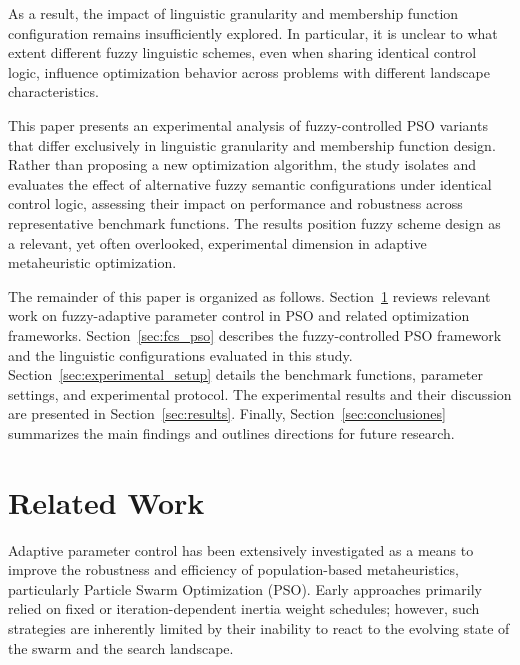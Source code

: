 \documentclass[runningheads]{llncs}
\begin{document}
As a result, the impact of linguistic granularity and membership function configuration remains insufficiently explored. In particular, it is unclear to what extent different fuzzy linguistic schemes, even when sharing identical control logic, influence optimization behavior across problems with different landscape characteristics.

This paper presents an experimental analysis of fuzzy-controlled PSO variants that differ exclusively in linguistic granularity and membership function design. Rather than proposing a new optimization algorithm, the study isolates and evaluates the effect of alternative fuzzy semantic configurations under identical control logic, assessing their impact on performance and robustness across representative benchmark functions. The results position fuzzy scheme design as a relevant, yet often overlooked, experimental dimension in adaptive metaheuristic optimization.

The remainder of this paper is organized as follows. Section~\ref{sec:related_work} reviews relevant work on fuzzy-adaptive parameter control in PSO and related optimization frameworks. Section~\ref{sec:fcs_pso} describes the fuzzy-controlled PSO framework and the linguistic configurations evaluated in this study. Section~\ref{sec:experimental_setup} details the benchmark functions, parameter settings, and experimental protocol. The experimental results and their discussion are presented in Section~\ref{sec:results}. Finally, Section~\ref{sec:conclusiones} summarizes the main findings and outlines directions for future research.



\section{Related Work}
\label{sec:related_work}

Adaptive parameter control has been extensively investigated as a means to improve the robustness and efficiency of population-based metaheuristics, particularly Particle Swarm Optimization (PSO). Early approaches primarily relied on fixed or iteration-dependent inertia weight schedules; however, such strategies are inherently limited by their inability to react to the evolving state of the swarm and the search landscape.

\vspace{-0.25cm}
\end{document}
